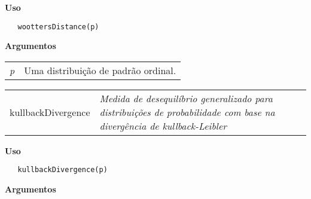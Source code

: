 \vspace{-0.5cm}

\hrulefill  

\vspace{0.5cm}

\textbf{Uso}

\begin{lstlisting}
   woottersDistance(p)
\end{lstlisting}

\vspace{0.5cm}

\textbf{Argumentos}

\begin{table}[!ht]
\begin{center}
\begin{tabularx}{\textwidth}{X X}
\hspace{0.5cm} \textit{p} & Uma distribuição de padrão ordinal.\\
\end{tabularx}
\end{center}
\end{table} 

\hrulefill   

\begin{table}[!ht]
\begin{center}
\begin{tabularx}{\textwidth}{ X X}
\hspace{0.5cm} kullbackDivergence & \textit{Medida de desequilíbrio generalizado para distribuições de probabilidade com base na divergência de kullback-Leibler}\\
\end{tabularx}
\end{center}
\end{table} 

\vspace{-0.5cm}

\hrulefill  

\vspace{0.5cm}

\textbf{Uso}

\begin{lstlisting}
   kullbackDivergence(p)
\end{lstlisting}

\vspace{0.5cm}

\textbf{Argumentos}

